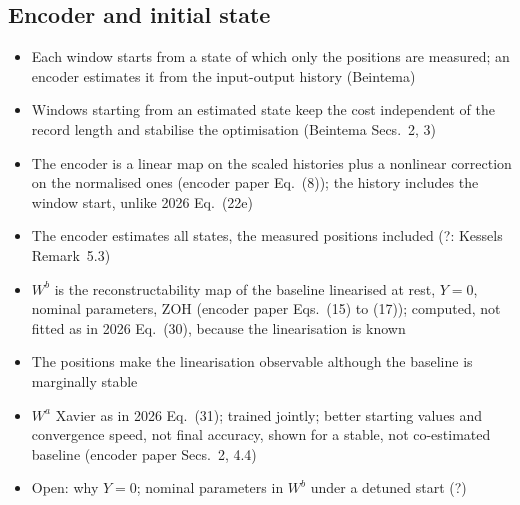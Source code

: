 \subsection{Encoder and initial state}\label{sec:aug_encoder}
\ifdraft
\begin{itemize}
\item Each window starts from a state of which only the positions are measured; an encoder estimates it from the input-output history (Beintema)
\item Windows starting from an estimated state keep the cost independent of the record length and stabilise the optimisation (Beintema Secs.~2, 3)
\item The encoder is a linear map on the scaled histories plus a nonlinear correction on the normalised ones (encoder paper Eq.~(8)); the history includes the window start, unlike 2026 Eq.~(22e)
\item The encoder estimates all states, the measured positions included (?: Kessels Remark~5.3)
\item $W^b$ is the reconstructability map of the baseline linearised at rest, $Y=0$, nominal parameters, ZOH (encoder paper Eqs.~(15) to (17)); computed, not fitted as in 2026 Eq.~(30), because the linearisation is known
\item The positions make the linearisation observable although the baseline is marginally stable
\item $W^a$ Xavier as in 2026 Eq.~(31); trained jointly; better starting values and convergence speed, not final accuracy, shown for a stable, not co-estimated baseline (encoder paper Secs.~2, 4.4)
\item Open: why $Y=0$; nominal parameters in $W^b$ under a detuned start (?)
\end{itemize}
\fi

